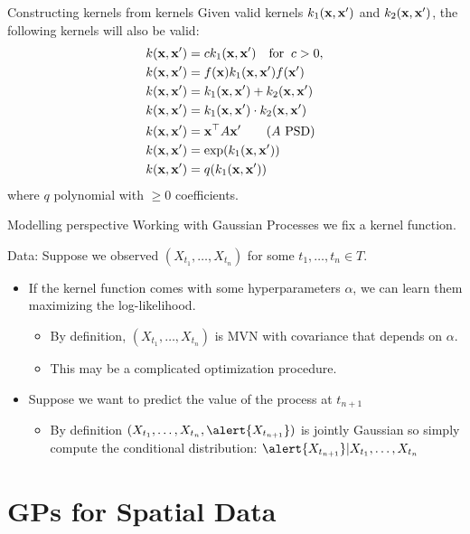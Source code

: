 \documentclass[11pt,handout,aspectratio=169]{beamer}
\begin{document}
\begin{frame}{Constructing kernels from kernels}
Given valid kernels $k_1(\mathbf{x},\mathbf{x}')$ and $k_2(\mathbf{x},\mathbf{x}')$, the following kernels will also be valid:
\begin{align*}
	k(\mathbf{x},\mathbf{x}')&=ck_1(\mathbf{x},\mathbf{x}')\quad\mbox{for}\;\; c>0,\\
	k(\mathbf{x},\mathbf{x}')&=f(\mathbf{x})k_1(\mathbf{x},\mathbf{x}')f(\mathbf{x}')\\
	k(\mathbf{x},\mathbf{x}')&=k_1(\mathbf{x},\mathbf{x}')+k_2(\mathbf{x},\mathbf{x}')\\
	k(\mathbf{x},\mathbf{x}')&=k_1(\mathbf{x},\mathbf{x}')\cdot k_2(\mathbf{x},\mathbf{x}')\\
	k(\mathbf{x},\mathbf{x}')&=\mathbf{x}^\top A\mathbf{x}'\qquad (A\mbox{ PSD})\\
	k(\mathbf{x},\mathbf{x}')&=\exp(k_1(\mathbf{x},\mathbf{x}'))\\
	k(\mathbf{x},\mathbf{x}')&=q(k_1(\mathbf{x},\mathbf{x}'))
\end{align*}
where $q$ polynomial with $\geq 0$ coefficients. 
\end{frame}


\begin{frame}{Modelling perspective}
Working with Gaussian Processes we 	fix a kernel function.

Data: Suppose we observed $(X_{t_1},\ldots,X_{t_n})$ for some $t_1,\ldots,t_n\in T$. 

\begin{itemize}
	\item If the kernel function comes with some hyperparameters $\alpha$, we can learn them maximizing the log-likelihood.
	\begin{itemize}
	\item By definition, $(X_{t_1},\ldots,X_{t_n})$ is MVN with covariance that depends on $\alpha$. 
	\item This may be a complicated optimization procedure.\\[1cm]
	\end{itemize}
	\item Suppose we want to predict the value of the process at $t_{n+1}$
	\begin{itemize}
	\item By definition  $(X_{t_1},\ldots,X_{t_n},\alert{X_{t_{n+1}}})$ is jointly Gaussian so simply compute the conditional distribution: $\alert{X_{t_{n+1}}}|X_{t_1},\ldots, X_{t_n}$
\end{itemize}	
\end{itemize}


\end{frame}


\section{GPs for Spatial Data}
\end{document}
